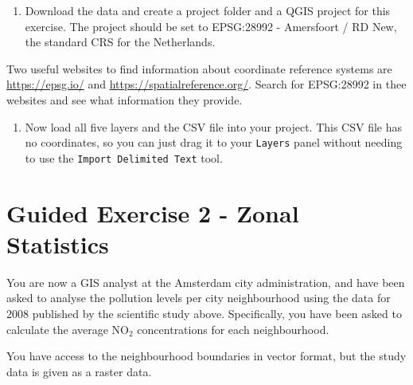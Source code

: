 \documentclass[
  letterpaper,
  DIV=11,
  numbers=noendperiod]{scrreprt}
\providecommand{\tightlist}{%
  \setlength{\itemsep}{0pt}\setlength{\parskip}{0pt}}\usepackage{longtable,booktabs,array}
\begin{document}
\begin{enumerate}
\def\labelenumi{(\arabic{enumi})}
\setcounter{enumi}{317}
\tightlist
\item
  Download the data and create a project folder and a QGIS project for
  this exercise. The project should be set to EPSG:28992 - Amersfoort /
  RD New, the standard CRS for the Netherlands.
\end{enumerate}

\begin{tcolorbox}[enhanced jigsaw, coltitle=black, toprule=.15mm, breakable, opacitybacktitle=0.6, left=2mm, colback=white, leftrule=.75mm, rightrule=.15mm, colbacktitle=quarto-callout-tip-color!10!white, toptitle=1mm, titlerule=0mm, colframe=quarto-callout-tip-color-frame, arc=.35mm, bottomtitle=1mm, opacityback=0, bottomrule=.15mm, title=\textcolor{quarto-callout-tip-color}{\faLightbulb}\hspace{0.5em}{Tip}]

Two useful websites to find information about coordinate reference
systems are \url{https://epsg.io/} and
\url{https://spatialreference.org/}. Search for EPSG:28992 in thee
websites and see what information they provide.

\end{tcolorbox}

\begin{enumerate}
\def\labelenumi{(\arabic{enumi})}
\setcounter{enumi}{318}
\tightlist
\item
  Now load all five layers and the CSV file into your project. This CSV
  file has no coordinates, so you can just drag it to your
  \texttt{Layers} panel without needing to use the
  \texttt{Import\ Delimited\ Text} tool.
\end{enumerate}

\section{Guided Exercise 2 - Zonal
Statistics}\label{guided-exercise-2---zonal-statistics}

You are now a GIS analyst at the Amsterdam city administration, and have
been asked to analyse the pollution levels per city neighbourhood using
the data for 2008 published by the scientific study above. Specifically,
you have been asked to calculate the average NO\(_2\) concentrations for
each neighbourhood.

You have access to the neighbourhood boundaries in vector format, but
the study data is given as a raster data.
\end{document}
